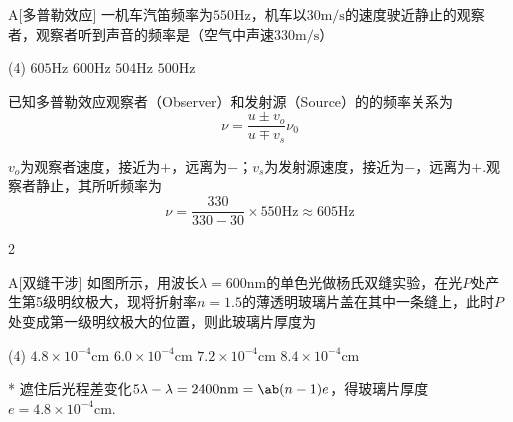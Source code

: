 \begin{choice}{A}[多普勒效应]
    一机车汽笛频率为$550\mathrm{Hz}$，机车以$30\mathrm{m/s}$的速度驶近静止的观察者，观察者听到声音的频率是（空气中声速$330\mathrm{m/s}$）
    \begin{tasks}(4)
        \task $605\mathrm{Hz}$
        \task $600\mathrm{Hz}$
        \task $504\mathrm{Hz}$
        \task $500\mathrm{Hz}$
    \end{tasks}
\end{choice}
\begin{solution}
    已知多普勒效应观察者（Observer）和发射源（Source）的的频率关系为
    \[\nu=\frac{u\pm v_o}{u\mp v_s}\nu_0\]

    $v_o$为观察者速度，接近为$+$，远离为$-$；$v_s$为发射源速度，接近为$-$，远离为$+$.观察者静止，其所听频率为
    \[\nu=\frac{330}{330-30}\times 550\mathrm{Hz}\approx 605\mathrm{Hz}\]

\end{solution}

\begin{paracol}{2}
    \begin{choice}{A}[双缝干涉]
        如图所示，用波长$\lambda=600\mathrm{nm}$的单色光做杨氏双缝实验，在光$P$处产生第5级明纹极大，现将折射率$n=1.5$的薄透明玻璃片盖在其中一条缝上，此时$P$处变成第一级明纹极大的位置，则此玻璃片厚度为
        \begin{tasks}(4)
            \task $4.8\times 10^{-4}\mathrm{cm}$
            \task $6.0\times 10^{-4}\mathrm{cm}$
            \task $7.2\times 10^{-4}\mathrm{cm}$
            \task $8.4\times 10^{-4}\mathrm{cm}$
        \end{tasks}
    \end{choice}
    \switchcolumn\centering
    \vfill
    \vfill
\end{paracol}
\begin{solution}*
    遮住后光程差变化$5\lambda-\lambda=2400\mathrm{nm}=\ab(n-1)e$，得玻璃片厚度$e=4.8\times 10^{-4}\mathrm{cm}$.
\end{solution}

